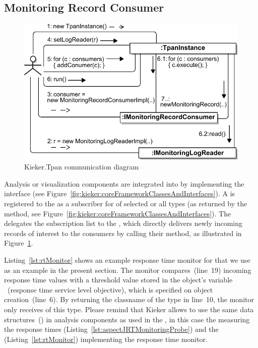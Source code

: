 \subsection{Monitoring Record Consumer}
% 
\begin{figure}\centering
\includegraphics[width=\columnwidth]{figures/LogAnalysisCommunications-bw}%
\caption{Kieker.Tpan communication diagram}
\label{fig:tpanCommunicationDiagram}
\end{figure}
% 
\noindent Analysis or visualization components are integrated into \KiekerTpan{} %
by implementing the  interface (see Figure~\ref{fig:kieker:coreFrameworkClassesAndInterfaces}). %
A \MonitoringRecordConsumer{} is registered to the \TpanInstance{} as a subscriber
for \MonitoringRecords{} of selected or all \MonitoringRecord{} types %
(as returned by the  method, see Figure~\ref{fig:kieker:coreFrameworkClassesAndInterfaces}). %
The \TpanInstance{} delegates the subscription list to the \MonitoringLogReader{},
which directly delivers newly incoming records of interest to the consumers by calling their
 method, as illustrated in %
Figure~\ref{fig:tpanCommunicationDiagram}. %

Listing~\ref{lst:rtMonitor} shows an example response time monitor for %
 that we use as an  example in the present section. %
The monitor compares~(line~19) incoming response time values  with a threshold value %
stored in the object's variable ~(response time service level objective), %
which is specified on object creation~(line~6). %
By returning the classname of the \MonitoringRecord{} type  %
in line~10, the monitor only receives \MonitoringRecords{} of this type. %
Please remind that Kieker allows to use
the same data structures~(\MonitoringRecords{}) in analysis components as used in the %
\MonitoringProbes{}, in this case the \MonitoringProbe{} measuring the response times %
(Listing~\ref{lst:aspectJRTMonitoringProbe}) and the \MonitoringRecordConsumer{} %
(Listing~\ref{lst:rtMonitor}) implementing the response time monitor.



